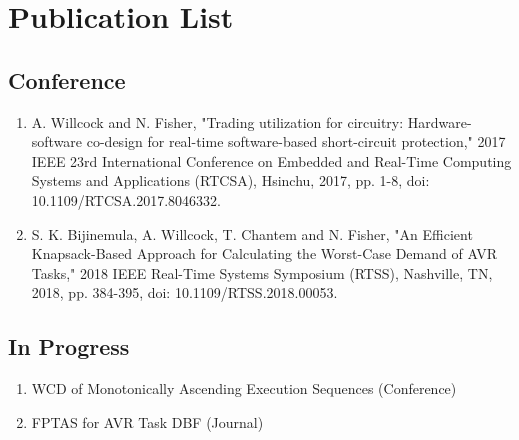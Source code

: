 \section{Publication List}   \label{chap:publicationList}

\subsection{Conference}

\begin{enumerate}
    \item A. Willcock and N. Fisher, "Trading utilization for circuitry: Hardware-software co-design for real-time software-based short-circuit protection," 2017 IEEE 23rd International Conference on Embedded and Real-Time Computing Systems and Applications (RTCSA), Hsinchu, 2017, pp. 1-8, doi: 10.1109/RTCSA.2017.8046332. \cite{willcock_trading_2017}
    \item S. K. Bijinemula, A. Willcock, T. Chantem and N. Fisher, "An Efficient Knapsack-Based Approach for Calculating the Worst-Case Demand of AVR Tasks," 2018 IEEE Real-Time Systems Symposium (RTSS), Nashville, TN, 2018, pp. 384-395, doi: 10.1109/RTSS.2018.00053. \cite{bijinemula_efficient_2019}
\end{enumerate}

\subsection{In Progress}

\begin{enumerate}
    \item WCD of Monotonically Ascending Execution Sequences (Conference)
    \item FPTAS for AVR Task DBF (Journal)
\end{enumerate}